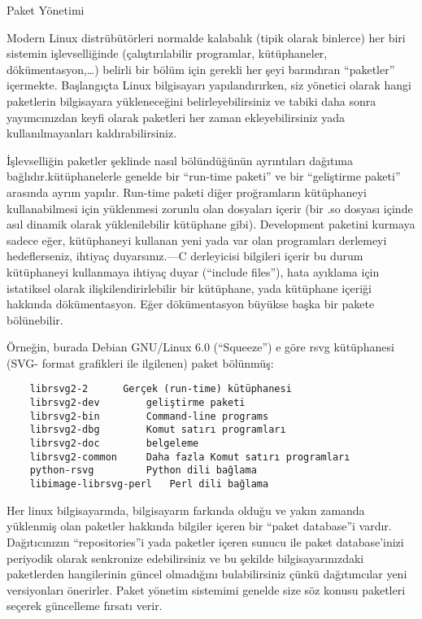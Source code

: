 \begin{section}{Paket Yönetimi}

Modern Linux distrübütörleri normalde kalabalık (tipik olarak binlerce) her biri sistemin işlevselliğinde (çalıştırılabilir programlar, kütüphaneler, dökümentasyon,…) belirli bir bölüm için gerekli her şeyi barındıran “paketler” içermekte. Başlangıçta Linux bilgisayarı yapılandırırken, siz yönetici olarak hangi paketlerin bilgisayara yükleneceğini belirleyebilirsiniz ve tabiki daha sonra yayımcınızdan keyfi olarak paketleri her zaman ekleyebilirsiniz yada kullanılmayanları kaldırabilirsiniz.

İşlevselliğin paketler şeklinde nasıl bölündüğünün ayrıntıları dağıtıma bağlıdır.kütüphanelerle genelde bir “run-time paketi” ve bir “geliştirme paketi” arasında ayrım yapılır. Run-time paketi diğer proğramların kütüphaneyi kullanabilmesi için yüklenmesi zorunlu olan dosyaları içerir (bir .so dosyası içinde asıl dinamik olarak yüklenilebilir kütüphane gibi). Development paketini kurmaya sadece eğer, kütüphaneyi kullanan yeni yada var olan programları derlemeyi hedeflerseniz, ihtiyaç duyarsınız.—C derleyicisi bilgileri içerir bu durum kütüphaneyi kullanmaya ihtiyaç duyar (“include files”), hata ayıklama için istatiksel olarak ilişkilendirirlebilir bir kütüphane, yada kütüphane içeriği hakkında dökümentasyon. Eğer dökümentasyon büyükse başka bir pakete bölünebilir.

Örneğin, burada Debian GNU/Linux 6.0 (“Squeeze”) e göre rsvg kütüphanesi (SVG- format grafikleri ile ilgilenen) paket bölünmüş: 
\begin{verbatim}
	librsvg2-2 		Gerçek (run-time) kütüphanesi
	librsvg2-dev 		geliştirme paketi
	librsvg2-bin 		Command-line programs
	librsvg2-dbg 		Komut satırı programları
	librsvg2-doc 		belgeleme
	librsvg2-common 	Daha fazla Komut satırı programları
	python-rsvg 		Python dili bağlama
	libimage-librsvg-perl 	Perl dili bağlama
\end{verbatim}

Her linux bilgisayarında, bilgisayarın farkında olduğu ve yakın zamanda yüklenmiş olan paketler hakkında bilgiler içeren bir “paket database”i vardır. 
Dağıtıcınızın “repositories”i yada paketler içeren sunucu ile paket database’inizi periyodik olarak senkronize edebilirsiniz ve bu şekilde bilgisayarınızdaki paketlerden hangilerinin güncel olmadığını bulabilirsiniz çünkü dağıtımcılar yeni versiyonları önerirler. Paket yönetim sistemimi genelde size söz konusu paketleri seçerek güncelleme fırsatı verir.


\end{section}
